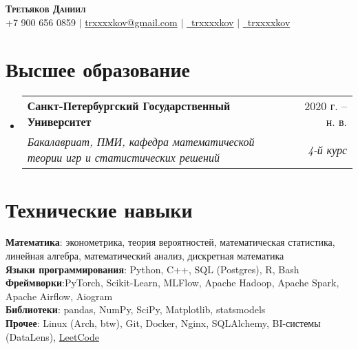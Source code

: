 \documentclass[a4paper, 11pt]{article}
\makeatletter
\newcommand{\resumeSubheading}[4]{
  \vspace{-2pt}\item
    \begin{tabular*}{0.97\textwidth}[t]{l@{\extracolsep{\fill}}r}
      \textbf{#1} & #2 \\
      \textit{\small#3} & \textit{\small #4} \\
    \end{tabular*}\vspace{-7pt}
}
\newcommand{\resumeSubHeadingListStart}{\begin{itemize}[leftmargin=0.15in, label={}]}
\newcommand{\resumeSubHeadingListEnd}{\end{itemize}}
\makeatother
\begin{document}
\begin{center}
    \textbf{\Huge \scshape Третьяков Даниил} \\ \vspace{5pt}
    \small +7 900 656 0859 $|$ \href{mailto:trxxxxkov@gmail.com}{trxxxxkov@gmail.com} $|$
    \href{https://t.me/trxxxxkov}{\faTelegram \ trxxxxkov} $|$  \href{https://github.com/trxxxxkov}{\faGithub \ trxxxxkov}
\end{center}


\section{Высшее образование}
  \resumeSubHeadingListStart
    \resumeSubheading
      {Санкт-Петербургский Государственный Университет}{2020 г. -- н. в.}
      {Бакалавриат, ПМИ, кафедра математической теории игр и статистических решений}
      {4-й курс}
  \resumeSubHeadingListEnd


\section{Технические навыки}
 \begin{itemize}[leftmargin=0.15in, label={}]
    \small{\item{
        \textbf{Математика}{: эконометрика, теория вероятностей, математическая статистика, линейная алгебра, математический анализ, дискретная математика} \\    
        \vspace{3pt}
        \textbf{Языки программирования}{: Python, C++, SQL (Postgres), R, Bash} \\
        \vspace{3pt}
        \textbf{Фреймворки}{:PyTorch, Scikit-Learn, MLFlow, Apache Hadoop, Apache Spark, Apache Airflow, Aiogram} \\
        \vspace{3pt}
        \textbf{Библиотеки}{: pandas, NumPy, SciPy, Matplotlib, statsmodels} \\
        \vspace{3pt}
        \textbf{Прочее}{: Linux (Arch, btw), Git, Docker, Nginx, SQLAlchemy, BI-системы (DataLens), \href{https://leetcode.com/u/trxxxxkov/}{LeetCode}} \\
    }}
 \end{itemize}

\end{document}

